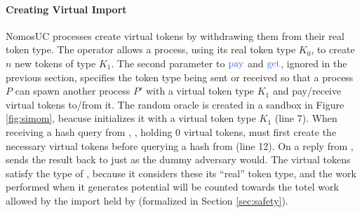 \paragraph{Creating Virtual Import}
NomosUC processes create virtual tokens by withdrawing them from their real
token type.  The operator  allows a process,
using its real token type $K_0$, to create $n$ new tokens of type $K_1$.  The
second parameter to $\npay$ and $\nget$, ignored in the previous section,
specifies the token type being sent or received so that a process $P$ can spawn
another process $P'$ with a virtual token type $K_1$ and pay/receive virtual
tokens to/from it.  The random oracle \Fro is created in a sandbox in Figure
\ref{fig:simom}, beacuse \simcom initializes it with a virtual token type $K_1$
(line 7).  When receiving a hash query from \Z,
\simcom, holding 0 virtual tokens, must first create the necessary virtual
tokens before querying a hash from \Fro (line 12).  On a reply from \Fro,
\simcom sends the result back to \Z just as the dummy adversary would.  The
virtual tokens satisfy the type of \Fro, because it considers these its
``real'' token type, and the work performed when it generates potential will be
counted towards the totel work allowed by the import held by \simcom
(formalized in Section \ref{sec:safety}).

